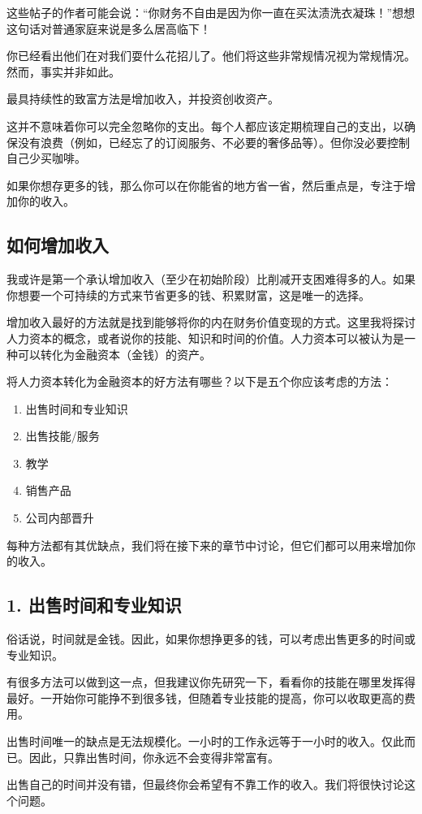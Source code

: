 这些帖子的作者可能会说：“你财务不自由是因为你一直在买汰渍洗衣凝珠！”想想这句话对普通家庭来说是多么居高临下！

你已经看出他们在对我们耍什么花招儿了。他们将这些非常规情况视为常规情况。然而，事实并非如此。

最具持续性的致富方法是增加收入，并投资创收资产。

这并不意味着你可以完全忽略你的支出。每个人都应该定期梳理自己的支出，以确保没有浪费（例如，已经忘了的订阅服务、不必要的奢侈品等）。但你没必要控制自己少买咖啡。

如果你想存更多的钱，那么你可以在你能省的地方省一省，然后重点是，专注于增加你的收入。

\subsection{如何增加收入}
我或许是第一个承认增加收入（至少在初始阶段）比削减开支困难得多的人。如果你想要一个可持续的方式来节省更多的钱、积累财富，这是唯一的选择。

增加收入最好的方法就是找到能够将你的内在财务价值变现的方式。这里我将探讨人力资本的概念，或者说你的技能、知识和时间的价值。人力资本可以被认为是一种可以转化为金融资本（金钱）的资产。

将人力资本转化为金融资本的好方法有哪些？以下是五个你应该考虑的方法：

\begin{enumerate}
\item 出售时间和专业知识
\item 出售技能/服务
\item 教学
\item 销售产品
\item 公司内部晋升
\end{enumerate}
每种方法都有其优缺点，我们将在接下来的章节中讨论，但它们都可以用来增加你的收入。

\subsection{1. 出售时间和专业知识}
俗话说，时间就是金钱。因此，如果你想挣更多的钱，可以考虑出售更多的时间或专业知识。

有很多方法可以做到这一点，但我建议你先研究一下，看看你的技能在哪里发挥得最好。一开始你可能挣不到很多钱，但随着专业技能的提高，你可以收取更高的费用。

出售时间唯一的缺点是无法规模化。一小时的工作永远等于一小时的收入。仅此而已。因此，只靠出售时间，你永远不会变得非常富有。

出售自己的时间并没有错，但最终你会希望有不靠工作的收入。我们将很快讨论这个问题。

